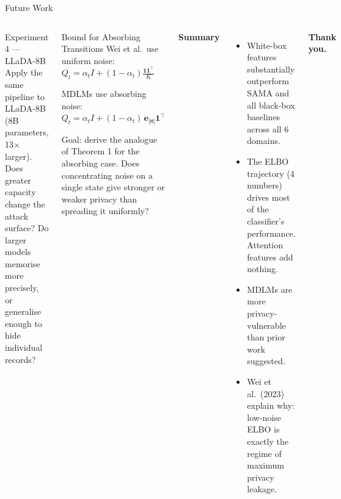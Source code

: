 \documentclass[aspectratio=169,10pt]{beamer}
\newcommand{\MASK}{\texttt{[M]}}
\begin{document}
\begin{frame}[shrink=5]{Future Work}

\begin{columns}[T]

  \begin{block}{Experiment 4 — LLaDA-8B}
    Apply the same pipeline to LLaDA-8B (8B parameters, 13$\times$ larger).
    Does greater capacity change the attack surface? Do larger models
    memorise more precisely, or generalise enough to hide individual records?
  \end{block}

  \vspace{0.3em}
  \begin{block}{Bound for Absorbing Transitions}
    Wei et al.\ use uniform noise:
    $Q_t = \alpha_t I + (1-\alpha_t)\tfrac{\mathbf{1}\mathbf{1}^\top}{K}$

    MDLMs use absorbing noise:
    $Q_t = \alpha_t I + (1-\alpha_t)\,\mathbf{e}_{\MASK}\mathbf{1}^\top$

    \smallskip
    Goal: derive the analogue of Theorem 1 for the absorbing case. Does
    concentrating noise on a single state give stronger or weaker privacy
    than spreading it uniformly?
  \end{block}


  \textbf{Summary}

  \smallskip
  \begin{itemize}
    \setlength\itemsep{0.3em}
    \item White-box features substantially outperform SAMA and all
      black-box baselines across all 6 domains.
    \item The ELBO trajectory (4 numbers) drives most of the classifier's
      performance. Attention features add nothing.
    \item MDLMs are more privacy-vulnerable than prior work suggested.
    \item Wei et al.\ (2023) explain why: low-noise ELBO is exactly the
      regime of maximum privacy leakage.
  \end{itemize}

  \vspace{0.6em}
  \begin{center}
    \large\textbf{Thank you.}
  \end{center}
\end{columns}

\end{frame}
\end{document}
